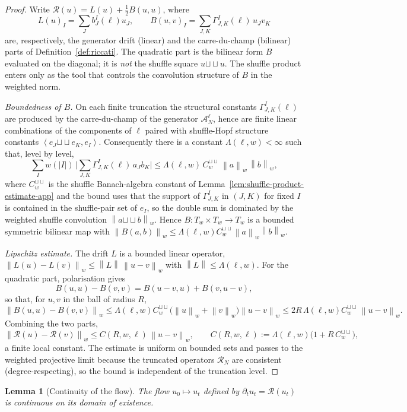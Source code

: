 \documentclass[11pt,oneside]{article}
\theoremstyle{plain}
\newtheorem{lemma}[theorem]{Lemma}
\theoremstyle{definition}
\theoremstyle{remark}
\newcommand{\Tw}{T_w}
\newcommand{\Rs}{\mathcal R}
\newcommand{\sh}{\mathbin{\sqcup\!\sqcup}}
\newcommand{\norm}[1]{\left\lVert #1\right\rVert}
\newcommand{\inner}[2]{\left\langle #1,#2\right\rangle}
\begin{document}
\begin{proof}
Write $\Rs(u)=L(u)+\tfrac12 B(u,u)$, where
\[
L(u)_I=\sum_J b_J^I(\ell)u_J,
\qquad
B(u,v)_I=\sum_{J,K}\Gamma^I_{J,K}(\ell)\,u_Jv_K
\]
are, respectively, the generator drift (linear) and the carre-du-champ
(bilinear) parts of Definition~\ref{def:riccati}. The quadratic part is
the bilinear form $B$ evaluated on the diagonal; it is \emph{not} the
shuffle square $u\sh u$. The shuffle product enters only as the tool
that controls the convolution structure of $B$ in the weighted norm.

\emph{Boundedness of $B$.} On each finite truncation the structural
constants $\Gamma^I_{J,K}(\ell)$ are produced by the carre-du-champ of
the generator $\mathcal A_N^\ell$, hence are finite linear combinations
of the components of $\ell$ paired with shuffle-Hopf structure
constants $\inner{e_J\sh e_K}{e_I}$. Consequently there is a constant
$\Lambda(\ell,w)<\infty$ such that, level by level,
\[
\sum_I w(|I|)\,\Big|\sum_{J,K}\Gamma^I_{J,K}(\ell)\,a_Jb_K\Big|
\leq \Lambda(\ell,w)\,C_w^{\sh}\,\norm{a}_w\,\norm{b}_w ,
\]
where $C_w^{\sh}$ is the shuffle Banach-algebra constant of
Lemma~\ref{lem:shuffle-product-estimate-app} and the bound uses that
the support of $\Gamma^I_{J,K}$ in $(J,K)$ for fixed $I$ is contained in
the shuffle-pair set of $e_I$, so the double sum is dominated by the
weighted shuffle convolution $\norm{a\sh b}_w$. Hence $B:\Tw\times\Tw\to
\Tw$ is a bounded symmetric bilinear map with
$\norm{B(a,b)}_w\leq \Lambda(\ell,w)C_w^{\sh}\norm{a}_w\norm{b}_w$.

\emph{Lipschitz estimate.} The drift $L$ is a bounded linear operator,
$\norm{L(u)-L(v)}_w\leq \norm{L}\,\norm{u-v}_w$ with
$\norm{L}\leq\Lambda(\ell,w)$. For the quadratic part, polarisation
gives
\[
B(u,u)-B(v,v)=B(u-v,u)+B(v,u-v),
\]
so that, for $u,v$ in the ball of radius $R$,
\[
\norm{B(u,u)-B(v,v)}_w
\leq \Lambda(\ell,w)C_w^{\sh}\big(\norm{u}_w+\norm{v}_w\big)\norm{u-v}_w
\leq 2R\,\Lambda(\ell,w)C_w^{\sh}\,\norm{u-v}_w .
\]
Combining the two parts,
\[
\norm{\Rs(u)-\Rs(v)}_w\leq C(R,w,\ell)\,\norm{u-v}_w,
\qquad
C(R,w,\ell):=\Lambda(\ell,w)\big(1+R\,C_w^{\sh}\big),
\]
a finite local constant. The estimate is uniform on bounded sets and
passes to the weighted projective limit because the truncated operators
$\Rs_N$ are consistent (degree-respecting), so the bound is independent
of the truncation level.
\end{proof}

\begin{lemma}[Continuity of the flow]
The flow $u_0\mapsto u_t$ defined by $\partial_tu_t=\Rs(u_t)$ is continuous on its domain of existence.
\end{lemma}
\end{document}
